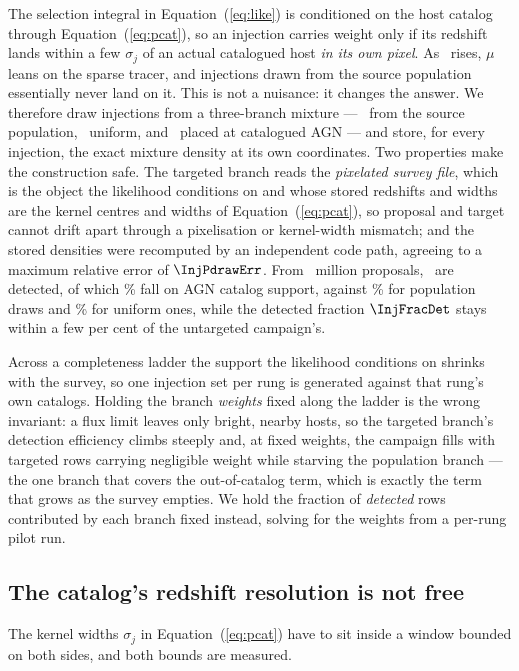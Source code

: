 The selection integral in Equation~(\ref{eq:like}) is conditioned on the host
catalog through Equation~(\ref{eq:pcat}), so an injection carries weight only if
its redshift lands within a few $\sigma_j$ of an actual catalogued host
\emph{in its own pixel}. As \fagn\ rises, $\mu$ leans on the sparse tracer, and
injections drawn from the source population essentially never land on it. This
is not a nuisance: it changes the answer. We therefore draw injections from a
three-branch mixture --- \InjWpop\ from the source population, \InjWuni\
uniform, and \InjWtgt\ placed at catalogued AGN --- and store, for every
injection, the exact mixture density at its own coordinates. Two properties
make the construction safe. The targeted branch reads the \emph{pixelated
survey file}, which is the object the likelihood conditions on and whose stored
redshifts and widths are the kernel centres and widths of
Equation~(\ref{eq:pcat}), so proposal and target cannot drift apart through a
pixelisation or kernel-width mismatch; and the stored densities were recomputed
by an independent code path, agreeing to a maximum relative error of
$\InjPdrawErr$. From \InjNdraw\ million proposals, \InjNdet\ are detected, of
which \InjOnAgnSupport\% fall on AGN catalog support, against \InjOnAgnPop\%
for population draws and \InjOnAgnUni\% for uniform ones, while the detected
fraction $\InjFracDet$ stays within a few per cent of the untargeted campaign's.

Across a completeness ladder the support the likelihood conditions on shrinks
with the survey, so one injection set per rung is generated against that rung's
own catalogs. Holding the branch \emph{weights} fixed along the ladder is the
wrong invariant: a flux limit leaves only bright, nearby hosts, so the targeted
branch's detection efficiency climbs steeply and, at fixed weights, the campaign
fills with targeted rows carrying negligible weight while starving the
population branch --- the one branch that covers the out-of-catalog term, which
is exactly the term that grows as the survey empties. We hold the fraction of
\emph{detected} rows contributed by each branch fixed instead, solving for the
weights from a per-rung pilot run.

\subsection{The catalog's redshift resolution is not free}
\label{sec:methods:kde}

The kernel widths $\sigma_j$ in Equation~(\ref{eq:pcat}) have to sit inside a
window bounded on both sides, and both bounds are measured.

